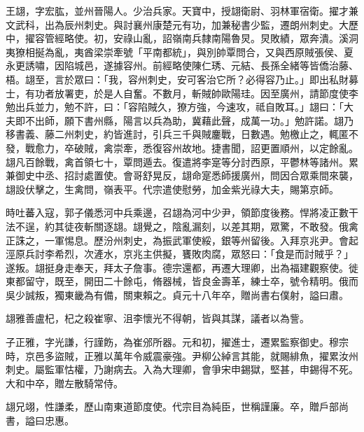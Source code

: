 \begin{pinyinscope}
 王翃，字宏肱，並州晉陽人。少治兵家。天寶中，授翃衛尉、羽林軍宿衛。擢才兼文武科，出為辰州刺史。與討襄州康楚元有功，加兼秘書少監，遷朗州刺史。大歷中，擢容管經略使。初，安祿山亂，詔嶺南兵隸南陽魯炅。炅敗績，眾奔潰。溪洞夷獠相挻為亂，夷酋梁崇牽號「平南都統」，與別帥覃問合，又與西原賊張侯、夏永更誘嘯，因陷城邑，遂據容州。前經略使陳仁琇、元結、長孫全緒等皆僑治藤、梧。翃至，言於眾曰：「我，容州刺史，安可客治它所？必得容乃止。」即出私財募士，有功者放署吏，於是人自奮。不數月，斬賊帥歐陽珪。因至廣州，請節度使李勉出兵並力，勉不許，曰：「容陷賊久，獠方強，今速攻，祗自敗耳。」翃曰：「大夫即不出師，願下書州縣，陽言以兵為助，冀藉此聲，成萬一功。」勉許諾。翃乃移書義、藤二州刺史，約皆進討，引兵三千與賊鏖戰，日數遇。勉檄止之，輒匿不發，戰愈力，卒破賊，禽崇牽，悉復容州故地。捷書聞，詔更置順州，以定餘亂。翃凡百餘戰，禽首領七十，覃問遁去。復遣將李寔等分討西原，平鬱林等諸州。累兼御史中丞、招討處置使。會哥舒晃反，翃命寔悉師援廣州，問因合眾乘間來襲，翃設伏擊之，生禽問，嶺表平。代宗遣使慰勞，加金紫光祿大夫，賜第京師。



 時吐蕃入寇，郭子儀悉河中兵乘邊，召翃為河中少尹，領節度後務。悍將凌正數干法不逞，約其徒夜斬關逐翃。翃覺之，陰亂漏刻，以差其期，眾驚，不敢發。俄禽正誅之，一軍惕息。歷汾州刺史，為振武軍使綏，銀等州留後。入拜京兆尹。會起涇原兵討李希烈，次滻水，京兆主供擬，饔敗肉腐，眾怒曰：「食是而討賊乎？」遂叛。翃挺身走奉天，拜太子詹事。德宗還都，再遷大理卿，出為福建觀察使。徙東都留守，既至，開田二十餘屯，脩器械，皆良金壽革，練士卒，號令精明。俄而吳少誠叛，獨東畿為有備，關東賴之。貞元十八年卒，贈尚書右僕射，謚曰肅。



 翃雅善盧杞，杞之殺崔寧、沮李懷光不得朝，皆與其謀，議者以為訾。



 子正雅，字光謙，行謹飭，為崔邠所器。元和初，擢進士，遷累監察御史。穆宗時，京邑多盜賊，正雅以萬年令威震豪強。尹柳公綽言其能，就賜緋魚，擢累汝州刺史。屬監軍怙權，乃謝病去。入為大理卿，會爭宋申錫獄，堅甚，申錫得不死。大和中卒，贈左散騎常侍。



 翃兄翊，性謙柔，歷山南東道節度使。代宗目為純臣，世稱謹廉。卒，贈戶部尚書，謚曰忠惠。




\end{pinyinscope}
